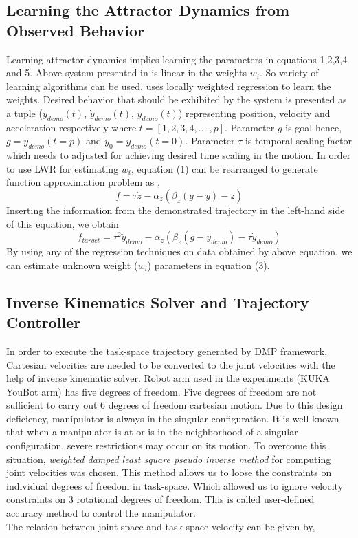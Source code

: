 \subsection{Learning the Attractor Dynamics from Observed Behavior}
\par Learning attractor dynamics implies learning the parameters in equations 1,2,3,4 and 5. Above system presented in \cite{ijspeert2013dynamical} is linear in the weights $w_{i}$. So variety of learning algorithms can be used. \cite{ijspeert2013dynamical} uses locally weighted regression to learn the weights. Desired behavior that should be exhibited by the system is presented as a tuple ($y_{demo}(t)$, $\dot{y}_{demo}(t)$, $\ddot{y}_{demo}(t)$) representing position, velocity and acceleration respectively where $t = [1,2,3,4,....,p]$. Parameter $g$ is goal hence, $g = y_{demo}(t = p)$ and $y_{0} = y_{demo}(t = 0)$. Parameter $\tau$ is temporal scaling factor which needs to adjusted for achieving desired time scaling in the motion. In order to use LWR for estimating $w_{i}$, equation (1) can be rearranged to generate function approximation problem as ,
\begin{equation}
f = \tau\dot{z} - \alpha_{z}(\beta_{z}(g - y) - z)
\end{equation}
Inserting the information from the demonstrated trajectory in the left-hand side of this equation, we obtain
\begin{equation}
f_{target} = \tau^{2}\ddot{y}_{demo} - \alpha_{z}(\beta_{z}(g - y_{demo}) - \tau\dot{y}_{demo})
\end{equation}
By using any of the regression techniques on data obtained by above equation, we can estimate unknown weight ($w_{i}$) parameters in equation (3). 




\subsection{Inverse Kinematics Solver and Trajectory Controller}

In order to execute the task-space trajectory generated by DMP framework, Cartesian velocities are needed to be converted to the joint velocities with the help of inverse kinematic solver. Robot arm used in the experiments (KUKA YouBot arm) has five degrees of freedom. Five degrees of freedom are not sufficient to carry out 6 degrees of freedom cartesian motion. Due to this design deficiency, manipulator is always in the singular configuration. It is well-known that when a manipulator is at-or is in the neighborhood of a singular configuration, severe restrictions may occur on its motion. To overcome this situation, \textit{weighted damped least square pseudo inverse method} for computing joint velocities was chosen. This method allows us to loose the constraints on individual degrees of freedom in task-space. Which allowed us to ignore velocity constraints on 3 rotational degrees of freedom. This is called user-defined accuracy method to control the manipulator. \cite{chiaverini1994review}
\\
The relation between joint space and task space velocity can be given by, 

